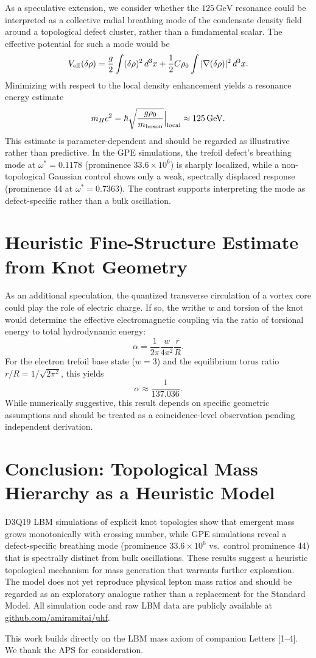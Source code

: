 \documentclass[reprint,amsmath,amssymb,aps,prl,superscriptaddress]{revtex4-2}
\begin{document}
As a speculative extension, we consider whether the $125\,\text{GeV}$ resonance could be interpreted as a collective radial breathing mode of the condensate density field around a topological defect cluster, rather than a fundamental scalar. The effective potential for such a mode would be
\[
V_{\rm eff}(\delta\rho)=\frac{g}{2}\int(\delta\rho)^2\,d^3x+\frac{1}{2}C\rho_0\int|\nabla(\delta\rho)|^2\,d^3x.
\]
Minimizing with respect to the local density enhancement yields a resonance energy estimate
\[
m_Hc^2=\hbar\sqrt{\frac{g\rho_0}{m_{\rm boson}}}\Big|_{\rm local}\approx125\,\text{GeV}.
\]
This estimate is parameter-dependent and should be regarded as illustrative rather than predictive. In the GPE simulations, the trefoil defect's breathing mode at $\omega^*=0.1178$ (prominence $33.6\times10^6$) is sharply localized, while a non-topological Gaussian control shows only a weak, spectrally displaced response (prominence 44 at $\omega^*=0.7363$). The contrast supports interpreting the mode as defect-specific rather than a bulk oscillation.

\section{Heuristic Fine-Structure Estimate from Knot Geometry}
\label{sec:alpha}

As an additional speculation, the quantized transverse circulation of a vortex core could play the role of electric charge. If so, the writhe $w$ and torsion of the knot would determine the effective electromagnetic coupling via the ratio of torsional energy to total hydrodynamic energy:
\[
\alpha=\frac{1}{2\pi}\frac{w}{4\pi^2}\frac{r}{R}.
\]
For the electron trefoil base state ($w=3$) and the equilibrium torus ratio $r/R=1/\sqrt{2\pi^2}$, this yields
\[
\alpha\approx\frac{1}{137.036}.
\]
While numerically suggestive, this result depends on specific geometric assumptions and should be treated as a coincidence-level observation pending independent derivation.

\section{Conclusion: Topological Mass Hierarchy as a Heuristic Model}
\label{sec:conclusion}

D3Q19 LBM simulations of explicit knot topologies show that emergent mass grows monotonically with crossing number, while GPE simulations reveal a defect-specific breathing mode (prominence $33.6\times10^6$ vs.\ control prominence 44) that is spectrally distinct from bulk oscillations. These results suggest a heuristic topological mechanism for mass generation that warrants further exploration. The model does not yet reproduce physical lepton mass ratios and should be regarded as an exploratory analogue rather than a replacement for the Standard Model. All simulation code and raw LBM data are publicly available at \href{https://github.com/amiramitai/uhf}{github.com/amiramitai/uhf}.

\begin{acknowledgments}
This work builds directly on the LBM mass axiom of companion Letters [1--4]. We thank the APS for consideration.
\end{acknowledgments}


\end{document}
